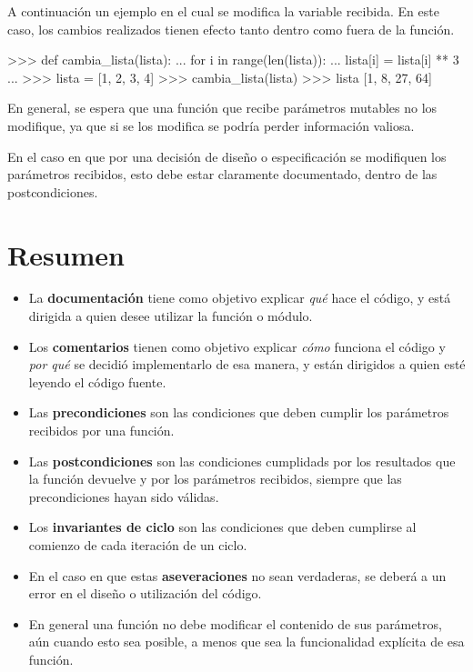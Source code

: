 A continuación un ejemplo en el cual se modifica la variable recibida. En este
caso, los cambios realizados tienen efecto tanto dentro como fuera de la
función.

\begin{codigo-python-sn}
>>> def cambia_lista(lista):
...     for i in range(len(lista)):
...         lista[i] = lista[i] ** 3
...
>>> lista = [1, 2, 3, 4]
>>> cambia_lista(lista)
>>> lista
[1, 8, 27, 64]
\end{codigo-python-sn}

\begin{atencion}
En general, se espera que una función que recibe parámetros mutables no los
modifique, ya que si se los modifica se podría perder información valiosa.

En el caso en que por una decisión de diseño o especificación se modifiquen
los parámetros recibidos, esto debe estar claramente documentado, dentro de
las postcondiciones.
\end{atencion}

\section{Resumen}

\begin{itemize}
\item La \textbf{documentación} tiene como objetivo explicar \emph{qué} hace el código,
    y está dirigida a quien desee utilizar la función o módulo.
\item Los \textbf{comentarios} tienen como objetivo explicar \emph{cómo} funciona el
    código y \emph{por qué} se decidió implementarlo de esa manera, y están dirigidos a
    quien esté leyendo el código fuente.
\item Las \textbf{precondiciones} son las condiciones que deben cumplir los
parámetros recibidos por una función.
\item Las \textbf{postcondiciones} son las condiciones cumplidads por los
resultados que la función devuelve y por los parámetros recibidos, siempre
que las precondiciones hayan sido válidas.
\item Los \textbf{invariantes de ciclo} son las condiciones que deben
cumplirse al comienzo de cada iteración de un ciclo.
\item En el caso en que estas \textbf{aseveraciones} no sean verdaderas, se
deberá a un error en el diseño o utilización del código.
\item En general una función no debe modificar el contenido de sus parámetros,
aún cuando esto sea posible, a menos que sea la funcionalidad explícita de esa
función.
\end{itemize}

